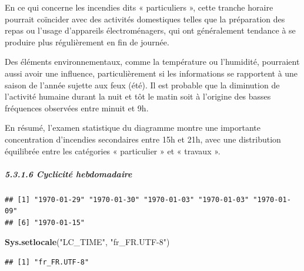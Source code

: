 \documentclass[
]{article}
\newenvironment{Shaded}{\begin{snugshade}}{\end{snugshade}}
\newcommand{\AttributeTok}[1]{\textcolor[rgb]{0.13,0.29,0.53}{#1}}
\newcommand{\FunctionTok}[1]{\textcolor[rgb]{0.13,0.29,0.53}{\textbf{#1}}}
\newcommand{\NormalTok}[1]{#1}
\newcommand{\OtherTok}[1]{\textcolor[rgb]{0.56,0.35,0.01}{#1}}
\newcommand{\SpecialCharTok}[1]{\textcolor[rgb]{0.81,0.36,0.00}{\textbf{#1}}}
\newcommand{\StringTok}[1]{\textcolor[rgb]{0.31,0.60,0.02}{#1}}
\begin{document}
En ce qui concerne les incendies dits « particuliers », cette tranche
horaire pourrait coïncider avec des activités domestiques telles que la
préparation des repas ou l'usage d'appareils électroménagers, qui ont
généralement tendance à se produire plus régulièrement en fin de
journée.

Des éléments environnementaux, comme la température ou l'humidité,
pourraient aussi avoir une influence, particulièrement si les
informations se rapportent à une saison de l'année sujette aux feux
(été). Il est probable que la diminution de l'activité humaine durant la
nuit et tôt le matin soit à l'origine des basses fréquences observées
entre minuit et 9h.

En résumé, l'examen statistique du diagramme montre une importante
concentration d'incendies secondaires entre 15h et 21h, avec une
distribution équilibrée entre les catégories « particulier » et «
travaux ».

\subparagraph{5.3.1.6 Cyclicité
hebdomadaire}\label{cyclicituxe9-hebdomadaire}

\begin{Shaded}
\end{Shaded}

\begin{verbatim}
## [1] "1970-01-29" "1970-01-30" "1970-01-03" "1970-01-03" "1970-01-09"
## [6] "1970-01-15"
\end{verbatim}

\begin{Shaded}
\begin{Highlighting}[]
\FunctionTok{Sys.setlocale}\NormalTok{(}\StringTok{"LC\_TIME"}\NormalTok{, }\StringTok{"fr\_FR.UTF{-}8"}\NormalTok{)  }
\end{Highlighting}
\end{Shaded}

\begin{verbatim}
## [1] "fr_FR.UTF-8"
\end{verbatim}
\end{document}
